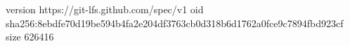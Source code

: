 version https://git-lfs.github.com/spec/v1
oid sha256:8ebdfe70d19be594b4fa2e204df3763cb0d318b6d1762a0fce9c7894fbd923cf
size 626416
